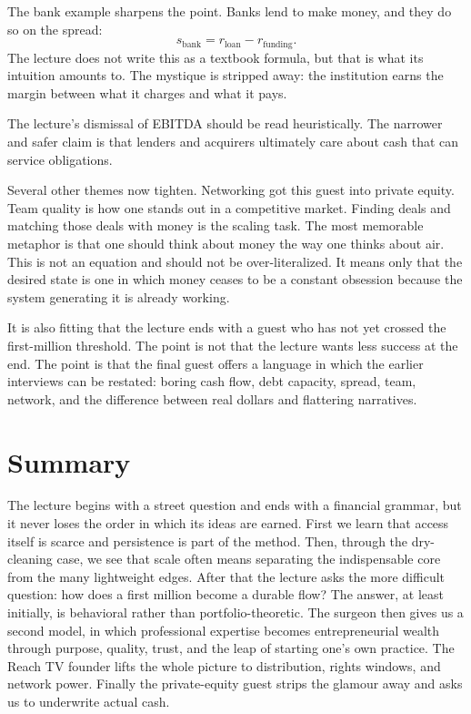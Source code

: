 The bank example sharpens the point. Banks lend to make money, and they do so on the spread:
\begin{equation}
s_{\text{bank}} = r_{\text{loan}} - r_{\text{funding}}.
\end{equation}
The lecture does not write this as a textbook formula, but that is what its intuition amounts to. The mystique is stripped away: the institution earns the margin between what it charges and what it pays.

\begin{remark}
The lecture's dismissal of EBITDA should be read heuristically. The narrower and safer claim is that lenders and acquirers ultimately care about cash that can service obligations.
\end{remark}

Several other themes now tighten. Networking got this guest into private equity. Team quality is how one stands out in a competitive market. Finding deals and matching those deals with money is the scaling task. The most memorable metaphor is that one should think about money the way one thinks about air. This is not an equation and should not be over-literalized. It means only that the desired state is one in which money ceases to be a constant obsession because the system generating it is already working.

It is also fitting that the lecture ends with a guest who has not yet crossed the first-million threshold. The point is not that the lecture wants less success at the end. The point is that the final guest offers a language in which the earlier interviews can be restated: boring cash flow, debt capacity, spread, team, network, and the difference between real dollars and flattering narratives.

\section{Summary}

The lecture begins with a street question and ends with a financial grammar, but it never loses the order in which its ideas are earned. First we learn that access itself is scarce and persistence is part of the method. Then, through the dry-cleaning case, we see that scale often means separating the indispensable core from the many lightweight edges. After that the lecture asks the more difficult question: how does a first million become a durable flow? The answer, at least initially, is behavioral rather than portfolio-theoretic. The surgeon then gives us a second model, in which professional expertise becomes entrepreneurial wealth through purpose, quality, trust, and the leap of starting one's own practice. The Reach TV founder lifts the whole picture to distribution, rights windows, and network power. Finally the private-equity guest strips the glamour away and asks us to underwrite actual cash.

